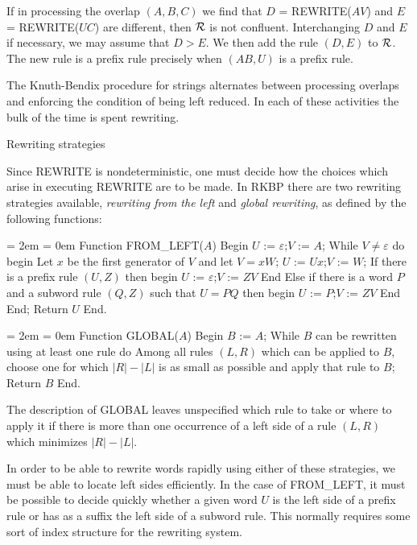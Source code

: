 If in processing the overlap $(A,B,C)$ we find that $D$ =
REWRITE($AV$) and $E$ = REWRITE($UC$) are different, then ${\cal R}$
is not confluent.  Interchanging $D$ and $E$ if necessary, we may
assume that $D>E$.  We then add the rule $(D,E)$ to ${\cal R}$.  The
new rule is a prefix rule precisely when $(AB,U)$ is a prefix rule.

The Knuth-Bendix procedure for strings alternates between processing
overlaps and enforcing the condition of being left reduced.  In each
of these activities the bulk of the time is spent rewriting.


\bigskip

 Rewriting strategies

\nobreak

Since REWRITE is nondeterministic, one must decide how the choices
which arise in executing REWRITE are to be made.  In RKBP there are
two rewriting strategies available, {\it rewriting from the left\/}
and {\it global rewriting\/}, as defined by the following functions:

\medskip

{\parindent = 2em \parskip = 0em \obeylines
\ind Function FROM\_LEFT($A$)
\ind Begin
\indb $U$ := $\varepsilon$;\quad $V$ := $A$;
\smallskip
\indb While $V\ne\varepsilon$ do begin
\indc  Let $x$ be the first generator of $V$ and let $V=xW$;
\indc  $U$ := $Ux$;\quad $V$ := $W$;
\smallskip
\indc  If there is a prefix rule $(U,Z)$ then begin
\nobreak
\indd   $U$ := $\varepsilon$;\quad $V$ := $ZV$
\nobreak
\indc  End
\smallskip
\indc  Else if there is a word $P$ and a subword rule $(Q,Z)$ such that $U=PQ$
\indc \quad then begin
\indd   $U$ := $P$;\quad $V$ := $ZV$
\indc  End
\indb End;
\smallskip
\indb Return $U$
\ind End.}

\medskip

{\parindent = 2em \parskip = 0em \obeylines
\ind Function GLOBAL($A$)
\ind Begin
\indb $B$ := $A$;
\smallskip
\indb While $B$ can be rewritten using at least one rule do
\indc  Among all rules $(L,R)$ which can be applied to $B$, choose one for which
\indc \quad $|R|-|L|$ is as small as possible and apply that rule to $B$;
\smallskip
\indb Return $B$
\ind End.}

\medskip

\noindent The description of GLOBAL leaves unspecified which rule to
take or where to apply it if there is more than one occurrence of a
left side of a rule $(L,R)$ which minimizes $|R|-|L|$.

In order to be able to rewrite words rapidly using either of these
strategies, we must be able to locate left sides efficiently.  In the
case of FROM\_LEFT, it must be possible to decide quickly whether
a given word $U$ is the left side of a prefix rule or has as a suffix
the left side of a subword rule.  This normally requires some sort of
index structure for the rewriting system.

